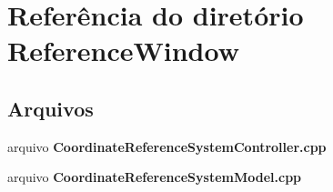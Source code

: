 \section{Referência do diretório Reference\+Window}
\label{dir_ebdbd13348fa2aca00893e24272a3f27}
\subsection*{Arquivos}
\begin{DoxyCompactItemize}
\item 
arquivo {\bf Coordinate\+Reference\+System\+Controller.\+cpp}
\item 
arquivo {\bf Coordinate\+Reference\+System\+Model.\+cpp}
\end{DoxyCompactItemize}
